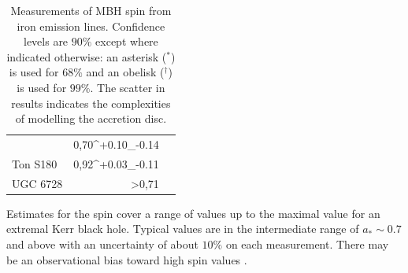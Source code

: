 \begin{table}
\begin{tabular}{l D{,}{.}{3.11} l }
 & 0,70^{+0.10}_{-0.14} & \citet{Patrick2011} \\ %
Ton S180 & 0,92^{+0.03}_{-0.11} & \citet{Walton2013} \\ %
UGC 6728 & >0,71 & \citet{Walton2013} \\ %
 \bottomrule
\end{tabular}
\caption{Measurements of MBH spin from iron emission lines. Confidence levels are $90\%$ except where indicated otherwise: an asterisk ($^\ast$) is used for $68\%$ and an obelisk ($^\dagger$) is used for $99\%$. The scatter in results indicates the complexities of modelling the accretion disc.}\label{tab:X-ray}
\vspace{-3pt}
\end{table}
Estimates for the spin cover a range of values up to the maximal value for an extremal Kerr black hole. Typical values are in the intermediate range of $a_\ast \sim 0.7$ and above with an uncertainty of about $10\%$ on each measurement. There may be an observational bias toward high spin values \citep{Brenneman2011}.



